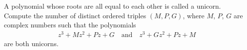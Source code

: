 A polynomial whose roots are all equal to each other is called a unicorn. Compute the number of distinct ordered triples $(M,P,G)$, where $M$, $P$, $G$ are complex numbers such that the polynomials 
\begin{align*}
z^{3} + M z^{2} + P z + G \quad \text{and} \quad z^{3} + G z^{2} + P z + M
\end{align*}
are both unicorns.